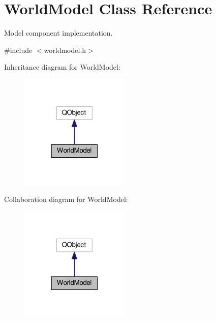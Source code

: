 \hypertarget{classWorldModel}{}\section{World\+Model Class Reference}
\label{classWorldModel}


Model component implementation.  




{\ttfamily \#include $<$worldmodel.\+h$>$}



Inheritance diagram for World\+Model\+:\nopagebreak
\begin{figure}[H]
\begin{center}
\leavevmode
\includegraphics[width=148pt]{de/d4d/classWorldModel__inherit__graph}
\end{center}
\end{figure}


Collaboration diagram for World\+Model\+:\nopagebreak
\begin{figure}[H]
\begin{center}
\leavevmode
\includegraphics[width=148pt]{da/dcc/classWorldModel__coll__graph}
\end{center}
\end{figure}
